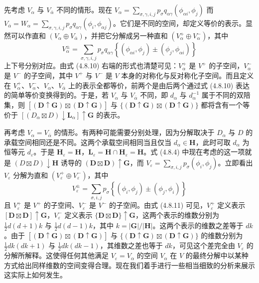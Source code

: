 先考虑 $V_{\alpha}$ 与 $V_{\bar{\alpha}}$ 不同的情形。现在 $V_{\alpha} = \sum_{\sigma, \gamma, i, j}p_{\sigma}q_{\alpha\gamma}(\phi_{\alpha i}, \phi_{j})$ 而 $V_{\bar{\alpha}} = W_{\alpha} = \sum_{\sigma, \gamma, i, j}p_{\sigma}q_{\alpha\gamma}(\phi_{i}, \phi_{\alpha j})$。它们是不同的空间，却定义等价的表示。显然可以作直和 $(V_{\alpha} \oplus V_{\bar{\alpha}})$，并把它分解成另一种直和 $(V^{+}_{\alpha} \oplus V^{-}_{\alpha})$，其中
\begin{equation*}
V^{\pm}_{\alpha} = \sum_{\sigma, \gamma, i, j}p_{\sigma}q_{\alpha\gamma}\left\{(\phi_{\alpha i}, \phi_{j}) \pm (\phi_{j}, \phi_{\alpha i})\right\}
\tag{4.8.10}
\end{equation*}
上下号分别对应。由式 (4.8.10) 右端的形式也清楚可见：$V^{+}_{\alpha}$ 是 $V^{+}$ 的子空间，$V^{-}_{\alpha}$ 是 $V^{-}$ 的子空间，其中 $V^{+}$ 与 $V^{-}$ 是 $V$ 本身的对称化与反对称化子空间。而且定义在 $V^{+}_{\alpha}$、$V^{-}_{\alpha}$、$V_{\alpha}$、$V_{\bar{\alpha}}$ 上的表示全都等价，前两个是由后两个通过式 (4.8.10) 表达的简单等价变换得到的。于是，若 $V_{\alpha}$ 与 $V_{\bar{\alpha}}$ 不同，即 $d_{\alpha}$ 与 $d^{-1}_{\alpha}$ 属于不同的双陪集，则 $[(\mathbf{D} \uparrow \mathbf{G}) \boxtimes (\mathbf{D} \uparrow \mathbf{G})]$ 与 $\{(\mathbf{D} \uparrow \mathbf{G}) \boxtimes (\mathbf{D} \uparrow \mathbf{G})\}$ 都将含有一个等价于 $\left[(D_{\alpha} \boxtimes D) \downarrow \mathbf{L}_{\alpha}\right] \uparrow \mathbf{G}$ 的表示。

再考虑 $V_{\alpha} = V_{\bar{\alpha}}$ 的情形。有两种可能需要分别处理，因为分解取决于 $D_{\alpha}$ 与 $D$ 的承载空间相同还是不同。这两个承载空间相同当且仅当 $d_{\alpha} \in \mathbf{H}$，此时可取 $d_{\alpha}$ 为恒等元 $d_{\varepsilon}$。于是 $\mathbf{H}_{\varepsilon} = \mathbf{H}$，$\mathbf{L}_{\varepsilon} = \mathbf{H} \cap \mathbf{H}_{\varepsilon} = \mathbf{H}$。式 (4.8.4) 中现在考虑的这一项就是 $(D \boxtimes D) \downarrow \mathbf{H}$ 诱导的 $(\mathbf{D} \boxtimes \mathbf{D}) \uparrow \mathbf{G}$，而 $V_{\varepsilon} = \sum_{\sigma, i, j}p_{\sigma}(\phi_{i}, \phi_{j})$。立即看出 $V_{\varepsilon}$ 分解为直和 $(V^{+}_{\varepsilon} \oplus V^{-}_{\varepsilon})$，其中
\begin{equation*}
V^{\pm}_{\varepsilon} = \sum_{\sigma, i, j}p_{\sigma}\left\{(\phi_{i}, \phi_{j}) \pm (\phi_{j}, \phi_{i})\right\}
\tag{4.8.11}
\end{equation*}
且 $V^{+}_{\varepsilon}$ 是 $V^{+}$ 的子空间、$V^{-}_{\varepsilon}$ 是 $V^{-}$ 的子空间。由式 (4.8.11) 可见，$V^{+}_{\varepsilon}$ 定义表示 $[\mathbf{D} \boxtimes \mathbf{D}] \uparrow \mathbf{G}$，$V^{-}_{\varepsilon}$ 定义表示 $\{\mathbf{D} \boxtimes \mathbf{D}\} \uparrow \mathbf{G}$，这两个表示的维数分别为 $\frac{1}{2}d(d+1)k$ 与 $\frac{1}{2}d(d-1)k$，其中 $k = |\mathbf{G}|/|\mathbf{H}|$。这两个表示的维数之差等于 $dk$。由于 $[(\mathbf{D} \uparrow \mathbf{G}) \boxtimes (\mathbf{D} \uparrow \mathbf{G})]$ 与 $\{(\mathbf{D} \uparrow \mathbf{G}) \boxtimes (\mathbf{D} \uparrow \mathbf{G})\}$ 的维数分别为 $\frac{1}{2}dk(dk+1)$ 与 $\frac{1}{2}dk(dk-1)$，其维数之差也等于 $dk$，可见这个差完全由 $V_{\varepsilon}$ 的分解所解释。这使得任何其他满足 $V_{\varepsilon} = V_{\alpha}$ 的空间 $V_{\alpha}$ 在 $V$ 的最终分解中以某种方式给出同样维数的空间变得合理。现在我们着手进行一些相当细致的分析来展示这实际上如何发生。


